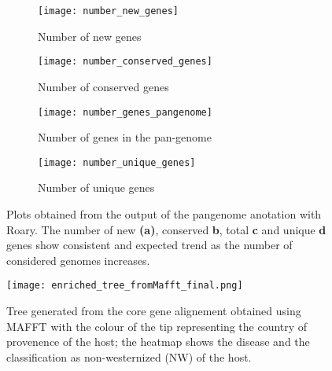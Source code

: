 \graphicspath{{images/pangenomeAnalysis/}{images/phylogeneticStructureHostData}}


\begin{figure}[h!] 
     \centering
     \begin{subfigure}[b]{0.45\textwidth}
        \centering
        \texttt{[image: number\_new\_genes]}
        \caption{Number of new genes}
        \label{fig:new genes}
     \end{subfigure}
     \hfill
     \begin{subfigure}[b]{0.45\textwidth}
        \centering
        \texttt{[image: number\_conserved\_genes]}
        \caption{Number of conserved genes}
        \label{fig:conserved genes}
     \end{subfigure}
     \hfill
     \begin{subfigure}[b]{0.45\textwidth}
        \centering
        \texttt{[image: number\_genes\_pangenome]}
        \caption{Number of genes in the pan-genome}
        \label{fig:pagenome genes}
     \end{subfigure}
     \hfill
     \begin{subfigure}[b]{0.45\textwidth}
        \centering
        \texttt{[image: number\_unique\_genes]}
        \caption{Number of unique genes}
        \label{fig:unique genes}
     \end{subfigure}
     \hfill
      \caption{\footnotesize{Plots obtained from the output of the pangenome anotation with Roary. The number of new \textbf{(a)}, conserved
      \textbf{b}}, total \textbf{c} and unique \textbf{d} genes show consistent and 
      expected trend as the number of considered genomes increases.}
      \label{fig:genes vs genomes}
\end{figure}




\begin{figure}
   \centering
   \texttt{[image: enriched\_tree\_fromMafft\_final.png]}
   \caption{\footnotesize{Tree generated from the core gene alignement
   obtained using MAFFT with the colour of the tip representing the country
   of provenence of the host; the heatmap shows the disease and the classification as 
   non-westernized (NW) of the host.}}
   \label{core alignement mafft tree}
\end{figure}


